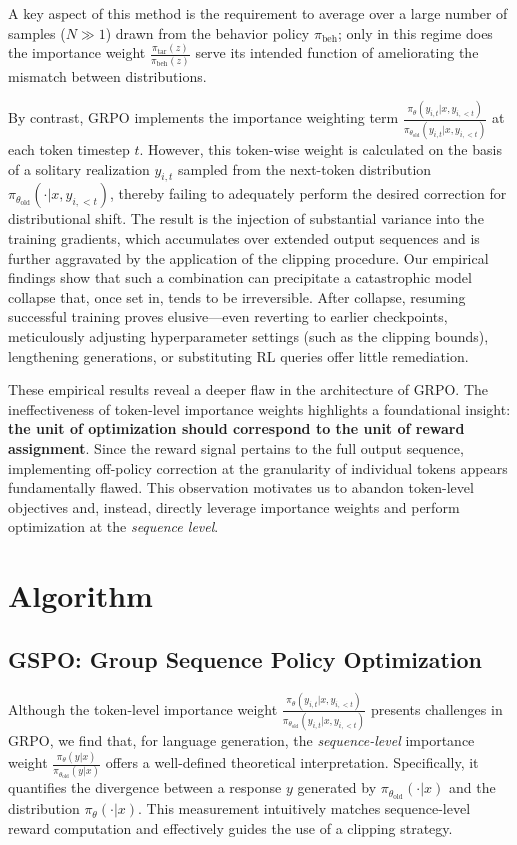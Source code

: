 A key aspect of this method is the requirement to average over a large number of samples ($N \gg 1$) drawn from the behavior policy $\pi_\text{beh}$; only in this regime does the importance weight $\frac{ \pi_\text{tar} (z) }{ \pi_\text{beh} (z)}$ serve its intended function of ameliorating the mismatch between distributions.

By contrast, GRPO implements the importance weighting term $\frac{ \pi_{\theta} (y_{i,t} | x, y_{i,<t}) }{ \pi_{\theta_\text{old}} (y_{i,t} | x,y_{i,<t})}$ at each token timestep $t$. However, this token-wise weight is calculated on the basis of a solitary realization $y_{i,t}$ sampled from the next-token distribution $\pi_{\theta_\text{old}}( \cdot | x, y_{i, <t})$, thereby failing to adequately perform the desired correction for distributional shift. The result is the injection of substantial variance into the training gradients, which accumulates over extended output sequences and is further aggravated by the application of the clipping procedure. Our empirical findings show that such a combination can precipitate a catastrophic model collapse that, once set in, tends to be irreversible. After collapse, resuming successful training proves elusive—even reverting to earlier checkpoints, meticulously adjusting hyperparameter settings (such as the clipping bounds), lengthening generations, or substituting RL queries offer little remediation.

These empirical results reveal a deeper flaw in the architecture of GRPO. The ineffectiveness of token-level importance weights highlights a foundational insight: \textbf{the unit of optimization should correspond to the unit of reward assignment}. Since the reward signal pertains to the full output sequence, implementing off-policy correction at the granularity of individual tokens appears fundamentally flawed. This observation motivates us to abandon token-level objectives and, instead, directly leverage importance weights and perform optimization at the \textit{sequence level}.

\section{Algorithm}

\subsection{GSPO: Group Sequence Policy Optimization}

Although the token-level importance weight $\frac{ \pi_{\theta} (y_{i,t} | x, y_{i,<t}) }{ \pi_{\theta_\text{old}} (y_{i,t} | x,y_{i,<t})}$ presents challenges in GRPO, we find that, for language generation, the \textit{sequence-level} importance weight $\frac{ \pi_{\theta} (y | x) }{ \pi_{\theta_\text{old}} (y | x)}$ offers a well-defined theoretical interpretation. Specifically, it quantifies the divergence between a response $y$ generated by $\pi_{\theta_\text{old}} (\cdot | x)$ and the distribution $\pi_{\theta} (\cdot | x)$. This measurement intuitively matches sequence-level reward computation and effectively guides the use of a clipping strategy.

